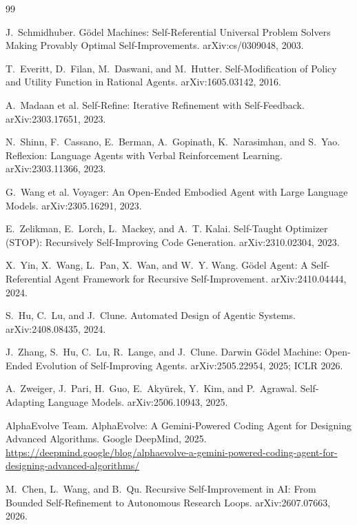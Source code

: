 \documentclass[11pt,a4paper]{article}
\begin{document}
\begin{thebibliography}{99}\small\raggedright
\setlength{\itemsep}{2pt}

 J.~Schmidhuber. G\"odel Machines: Self-Referential Universal Problem Solvers Making Provably Optimal Self-Improvements. arXiv:cs/0309048, 2003.

 T.~Everitt, D.~Filan, M.~Daswani, and M.~Hutter. Self-Modification of Policy and Utility Function in Rational Agents. arXiv:1605.03142, 2016.

 A.~Madaan et al. Self-Refine: Iterative Refinement with Self-Feedback. arXiv:2303.17651, 2023.

 N.~Shinn, F.~Cassano, E.~Berman, A.~Gopinath, K.~Narasimhan, and S.~Yao. Reflexion: Language Agents with Verbal Reinforcement Learning. arXiv:2303.11366, 2023.

 G.~Wang et al. Voyager: An Open-Ended Embodied Agent with Large Language Models. arXiv:2305.16291, 2023.

 E.~Zelikman, E.~Lorch, L.~Mackey, and A.~T. Kalai. Self-Taught Optimizer (STOP): Recursively Self-Improving Code Generation. arXiv:2310.02304, 2023.

 X.~Yin, X.~Wang, L.~Pan, X.~Wan, and W.~Y. Wang. G\"odel Agent: A Self-Referential Agent Framework for Recursive Self-Improvement. arXiv:2410.04444, 2024.

 S.~Hu, C.~Lu, and J.~Clune. Automated Design of Agentic Systems. arXiv:2408.08435, 2024.

 J.~Zhang, S.~Hu, C.~Lu, R.~Lange, and J.~Clune. Darwin G\"odel Machine: Open-Ended Evolution of Self-Improving Agents. arXiv:2505.22954, 2025; ICLR 2026.

 A.~Zweiger, J.~Pari, H.~Guo, E.~Aky\"urek, Y.~Kim, and P.~Agrawal. Self-Adapting Language Models. arXiv:2506.10943, 2025.

 AlphaEvolve Team. AlphaEvolve: A Gemini-Powered Coding Agent for Designing Advanced Algorithms. Google DeepMind, 2025. \url{https://deepmind.google/blog/alphaevolve-a-gemini-powered-coding-agent-for-designing-advanced-algorithms/}

 M.~Chen, L.~Wang, and B.~Qu. Recursive Self-Improvement in AI: From Bounded Self-Refinement to Autonomous Research Loops. arXiv:2607.07663, 2026.


\end{thebibliography}
\end{document}

